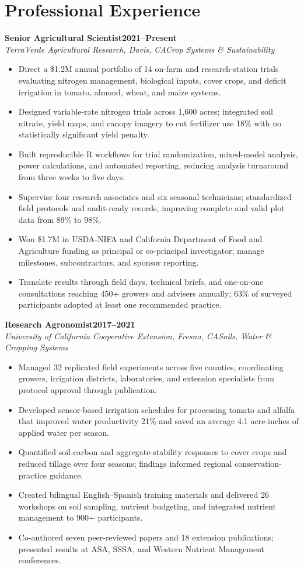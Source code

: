 \documentclass[10pt,letterpaper]{article}
\newcommand{\role}[4]{%
  \textbf{#1}\hfill\textbf{#2}\\[-1pt]
  \textit{#3}\hfill\textit{#4}\par
}
\begin{document}
\section*{Professional Experience}
\role{Senior Agricultural Scientist}{2021--Present}{TerraVerde Agricultural Research, Davis, CA}{Crop Systems \& Sustainability}
\begin{itemize}
  \item Direct a \$1.2M annual portfolio of 14 on-farm and research-station trials evaluating nitrogen management, biological inputs, cover crops, and deficit irrigation in tomato, almond, wheat, and maize systems.
  \item Designed variable-rate nitrogen trials across 1,600 acres; integrated soil nitrate, yield maps, and canopy imagery to cut fertilizer use 18\% with no statistically significant yield penalty.
  \item Built reproducible R workflows for trial randomization, mixed-model analysis, power calculations, and automated reporting, reducing analysis turnaround from three weeks to five days.
  \item Supervise four research associates and six seasonal technicians; standardized field protocols and audit-ready records, improving complete and valid plot data from 89\% to 98\%.
  \item Won \$1.7M in USDA-NIFA and California Department of Food and Agriculture funding as principal or co-principal investigator; manage milestones, subcontractors, and sponsor reporting.
  \item Translate results through field days, technical briefs, and one-on-one consultations reaching 450+ growers and advisers annually; 63\% of surveyed participants adopted at least one recommended practice.
\end{itemize}

\role{Research Agronomist}{2017--2021}{University of California Cooperative Extension, Fresno, CA}{Soils, Water \& Cropping Systems}
\begin{itemize}
  \item Managed 32 replicated field experiments across five counties, coordinating growers, irrigation districts, laboratories, and extension specialists from protocol approval through publication.
  \item Developed sensor-based irrigation schedules for processing tomato and alfalfa that improved water productivity 21\% and saved an average 4.1 acre-inches of applied water per season.
  \item Quantified soil-carbon and aggregate-stability responses to cover crops and reduced tillage over four seasons; findings informed regional conservation-practice guidance.
  \item Created bilingual English--Spanish training materials and delivered 26 workshops on soil sampling, nutrient budgeting, and integrated nutrient management to 900+ participants.
  \item Co-authored seven peer-reviewed papers and 18 extension publications; presented results at ASA, SSSA, and Western Nutrient Management conferences.
\end{itemize}
\end{document}
